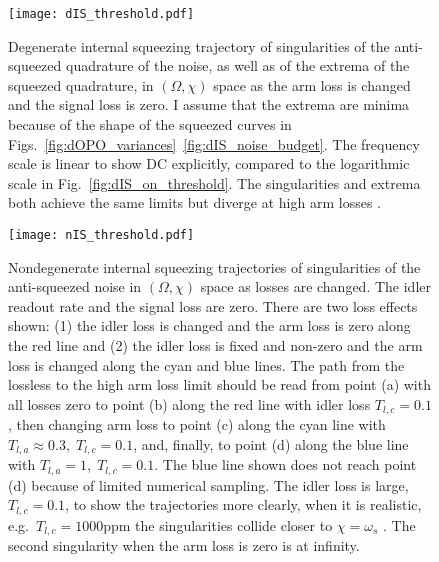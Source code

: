 \begin{figure}
    \centering
    \texttt{[image: dIS\_threshold.pdf]}
    \caption{  Degenerate internal squeezing trajectory of singularities of the anti-squeezed quadrature of the noise, as well as of the extrema of the squeezed quadrature, in $(\Omega, \chi)$ space as the arm loss is changed and the signal loss is zero. I assume that the extrema are minima because of the shape of the squeezed curves in Figs.~\ref{fig:dOPO_variances}~\ref{fig:dIS_noise_budget}.  The frequency scale is linear to show DC explicitly, compared to the logarithmic scale in Fig.~\ref{fig:dIS_on_threshold}. The singularities and extrema both achieve the same limits but diverge at high arm losses . }
    \label{fig:dIS_threshold_traj} %
\end{figure}
\begin{figure}
    \centering
    \texttt{[image: nIS\_threshold.pdf]}
    \caption{ Nondegenerate internal squeezing trajectories of singularities of the anti-squeezed noise in $(\Omega, \chi)$ space as losses are changed. The idler readout rate and the signal loss are zero. There are two loss effects shown: (1) the idler loss is changed and the arm loss is zero along the red line and (2) the idler loss is fixed and non-zero and the arm loss is changed along the cyan and blue lines. 
    The path from the lossless to the high arm loss limit should be read from point (a) with all losses zero to point (b) along the red line with idler loss $T_{l,c}=0.1$, then changing arm loss to point (c) along the cyan line with $T_{l,a}\approx0.3,\;T_{l,c}=0.1$, and, finally, to point (d) along the blue line with $T_{l,a}=1,\;T_{l,c}=0.1$. The blue line shown does not reach point (d) because of limited numerical sampling.
    The idler loss is large, $T_{l,c}=0.1$, to show the trajectories more clearly, when it is realistic, e.g.\ $T_{l,c}=1000\text{ppm}$ the singularities collide closer to $\chi=\omega_s$ . The second singularity when the arm loss is zero is at infinity. }
    \label{fig:nIS_threshold_traj}
\end{figure}

